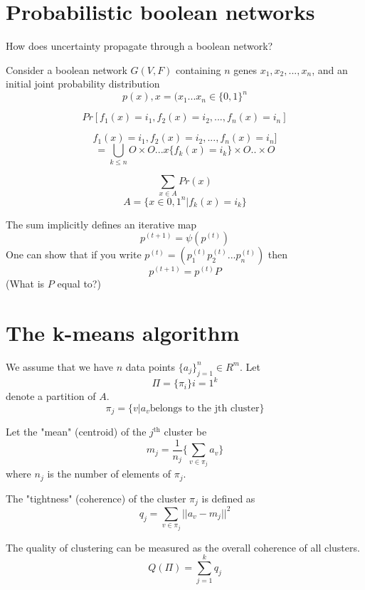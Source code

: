 \documentclass[10pt]{article}
\begin{document}
\section*{Probabilistic boolean networks}

How does uncertainty propagate through a boolean network?

Consider a boolean network $G(V,F)$ containing $n$ genes $x_1, x_2, ..., x_n$, and an initial joint probability distribution \[ p(x), x = (x_1 ... x_n \in \{ 0,1 \}^n \]

\[ Pr[ f_1(x) = i_1, f_2(x) = i_2, ..., f_n(x) = i_n ] \]

\[ f_1(x) = i_1, f_2(x) = i_2, ..., f_n(x) = i_n ] \]
\[ = \bigcup_{k \leq n} O \times O ... x\{ f_k(x) = i_k \} \times O .. \times O \]

\[ \sum_{x \in A} Pr(x) \]
\[ A = \{ x \in {0,1}^n | f_k(x) = i_k \} \]

The sum implicitly defines an iterative map \[ p^{(t + 1)} = \psi(p^{(t)}) \]
One can show that if you write $p^{(t)} = (p_1^{(t)} p_2^{(t)} ... p_n^{(t)})$ then
\[ p^{(t+1)} = p^{(t)} P \] (What is $P$ equal to?)


\section*{The k-means algorithm}

We assume that we have $n$ data points $\{ a_j \}_{j=1}^{n} \in R^{m}$. Let \[ \Pi = \{\pi_i\}{i=1}^{k} \] denote a partition of $A$.
\[ \pi_j = \{ v | a_v \text{belongs to the jth cluster} \} \]

Let the "mean" (centroid) of the $j^{\text{th}}$ cluster be \[ m_j = \frac{1}{n_j}\{ \sum_{v \in \pi_j} a_v \} \]
where $n_j$ is the number of elements of $\pi_j$.

The "tightness" (coherence) of the cluster $\pi_j$ is defined as \[ q_j = \sum_{v \in \pi_j} || a_v - m_j ||^2 \]

The quality of clustering can be measured as the overall coherence of all clusters. \[ Q(\Pi) = \sum_{j=1}^{k} q_j \]
\end{document}
